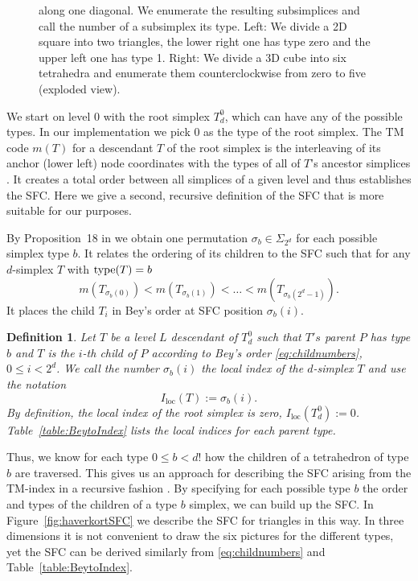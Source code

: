 \documentclass[a4paper,11pt]{article}
\newtheorem{dfn}[thm]{Definition}
\begin{document}
\begin{figure}
{         along one diagonal. We enumerate the resulting subsimplices and call
         the number of a subsimplex its type.
         Left: We divide a 2D square into two triangles, the lower right one
               has type zero and the upper left one has type 1.
         Right: We divide a 3D cube into six tetrahedra and enumerate them
               counterclockwise from zero to five (exploded view).}
\label{fig:typeofsimplex}
\end{figure}

We start on level 0 with the root simplex $T_d^0$, which can have any of the
possible types.
In our implementation we pick 0 as the type of the root simplex.
The TM code $m(T)$ for a descendant $T$ of the root simplex is the interleaving
of its anchor (lower left) node coordinates with the types of all of $T$'s
ancestor simplices \cite{BursteddeHolke16}.
It creates a total order between all simplices of a given level and thus
establishes the SFC.
Here we give a second, recursive definition of the SFC that is more suitable
for our purposes.

By Proposition~18 in \cite{BursteddeHolke16} we obtain one permutation
$\sigma_b \in \Sigma_{2^d}$ for each possible simplex type $b$.
It relates the ordering of
its
children to the SFC
such
that for any $d$-simplex $T$ with $\operatorname{type}(T) = b$
\begin{equation}
 m(T_{\sigma_b(0)})<m({T_{\sigma_b(1)}})<\dots<m({T_{\sigma_b(2^d-1)}})
 .
\end{equation}
It places the child $T_i$ in Bey's
order at SFC position $\sigma_b(i)$.
\begin{dfn}
 \label{def:localindex}
 Let $T$ be a level $L$ descendant of $T_d^0$ such that $T's$ parent $P$ has
 type $b$ and $T$ is the $i$-th child of $P$ according to Bey's order
 \eqref{eq:childnumbers},
  $0\leq i<2^d$. We call the number $\sigma_b(i)$ the \emph{local index} of
 the $d$-simplex $T$ and use the notation
 \begin{equation}
I_\mathrm{loc}(T):=\sigma_b(i).
 \end{equation}
 By definition, the local index of the root simplex is zero, $I_\mathrm{loc}(T^0_d):=0$.
 Table~\ref{table:BeytoIndex} lists the local indices for each parent type.
\end{dfn}
Thus, we know for each type $0\leq b<d!$ how the children of a tetrahedron of type $b$ are traversed.
This gives us an approach for describing the SFC arising from the TM-index in a recursive fashion \cite{HaverkortWalderveen10}.
By specifying for each possible type $b$ the order and types of the children of a type $b$ simplex, we can build up the SFC.
In Figure~\ref{fig:haverkortSFC} we describe the SFC for triangles in this way.
In three dimensions it is not convenient to draw the six pictures for the
different types, yet
the SFC can be derived similarly from \eqref{eq:childnumbers} and Table~\ref{table:BeytoIndex}.
\end{document}
